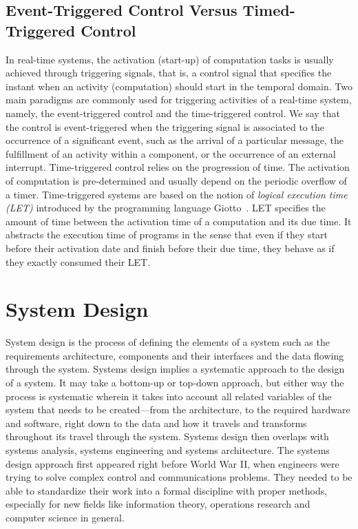 \subsection{Event-Triggered Control Versus Timed-Triggered Control}
In real-time systems, the activation (start-up) of computation tasks is usually achieved through
triggering signals, that is, a control signal that specifies the instant when an activity 
(computation) should start in the temporal domain.
Two main paradigms are commonly used for triggering activities of a real-time system, namely,
the event-triggered control and the time-triggered control.
We say that the control is event-triggered when the triggering signal is associated to 
the occurrence of a significant event, such as the arrival of a particular message, the 
fulfillment of an activity within a component, or the occurrence of an external interrupt.
Time-triggered control relies on the progression of time. The activation of computation is 
pre-determined and usually depend on the periodic overflow of a timer.
Time-triggered systems are based on the notion of \emph{logical execution time (LET)} 
introduced by the programming language Giotto~\cite{intro:giotto}. LET specifies the amount of 
time between the activation time of a computation and its due time. It abstracts the execution
time of programs in the sense that even if they start before their activation date 
and finish before their due time, they behave as if they exactly consumed their LET.

\section{System Design}
System design is the process of defining the elements of a system such as the requirements 
architecture, components and their interfaces and the data flowing through the system.
Systems design implies a systematic approach to the design of a system. It may take a bottom-up 
or top-down approach, but either way the process is systematic wherein it takes into account all
related variables of the system that needs to be created—from the architecture, to the required 
hardware and software, right down to the data and how it travels and transforms throughout its 
travel through the system. Systems design then overlaps with systems analysis, systems 
engineering and systems architecture.
The systems design approach first appeared right before World War II, when engineers were 
trying to solve complex control and communications problems. They needed to be able to 
standardize their work into a formal discipline with proper methods, especially for new fields 
like information theory, operations research and computer science in general.

